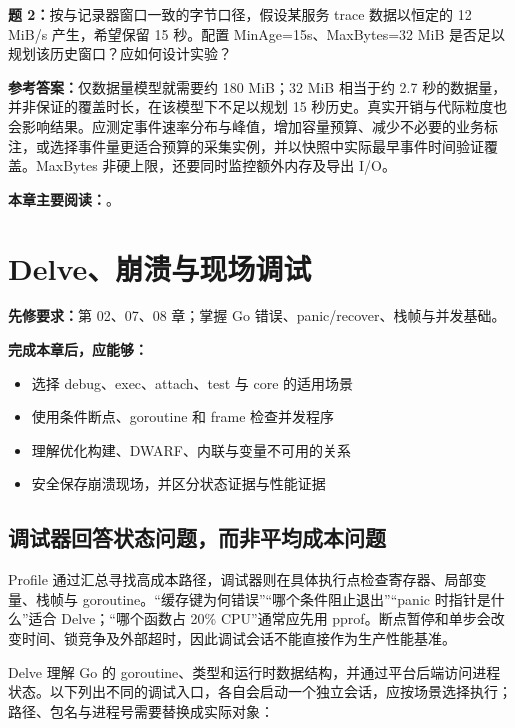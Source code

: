 \documentclass[UTF8,fontset=fandol,openany,11pt]{ctexbook}
\begin{document}
\noindent\textbf{题 2：}按与记录器窗口一致的字节口径，假设某服务 trace 数据以恒定的 12 MiB/s 产生，希望保留 15 秒。配置 MinAge=15s、MaxBytes=32 MiB 是否足以规划该历史窗口？应如何设计实验？

\noindent\textbf{参考答案：}仅数据量模型就需要约 180 MiB；32 MiB 相当于约 2.7 秒的数据量，并非保证的覆盖时长，在该模型下不足以规划 15 秒历史。真实开销与代际粒度也会影响结果。应测定事件速率分布与峰值，增加容量预算、减少不必要的业务标注，或选择事件量更适合预算的采集实例，并以快照中实际最早事件时间验证覆盖。MaxBytes 非硬上限，还要同时监控额外内存及导出 I/O。

\medskip\noindent\textbf{本章主要阅读：}\cite{tools-trace-doc}\cite{tools-trace-cmd}\cite{tools-trace-annotation}\cite{tools-go122}\cite{tools-trace2024}\cite{tools-go125}\cite{tools-flight-blog}\cite{tools-flight-source}。
\chapter{Delve、崩溃与现场调试}
\label{ch:09}
\par\medskip
\noindent\textbf{先修要求：}第 02、07、08 章；掌握 Go 错误、panic/recover、栈帧与并发基础。

\noindent\textbf{完成本章后，应能够：}
\begin{itemize}
\item 选择 debug、exec、attach、test 与 core 的适用场景
\item 使用条件断点、goroutine 和 frame 检查并发程序
\item 理解优化构建、DWARF、内联与变量不可用的关系
\item 安全保存崩溃现场，并区分状态证据与性能证据
\end{itemize}
\section{调试器回答状态问题，而非平均成本问题}
Profile 通过汇总寻找高成本路径，调试器则在具体执行点检查寄存器、局部变量、栈帧与 goroutine。“缓存键为何错误”“哪个条件阻止退出”“panic 时指针是什么”适合 Delve；“哪个函数占 20\% CPU”通常应先用 pprof。断点暂停和单步会改变时间、锁竞争及外部超时，因此调试会话不能直接作为生产性能基准。

Delve 理解 Go 的 goroutine、类型和运行时数据结构，并通过平台后端访问进程状态。以下列出不同的调试入口，各自会启动一个独立会话，应按场景选择执行；路径、包名与进程号需要替换成实际对象：

\end{document}

